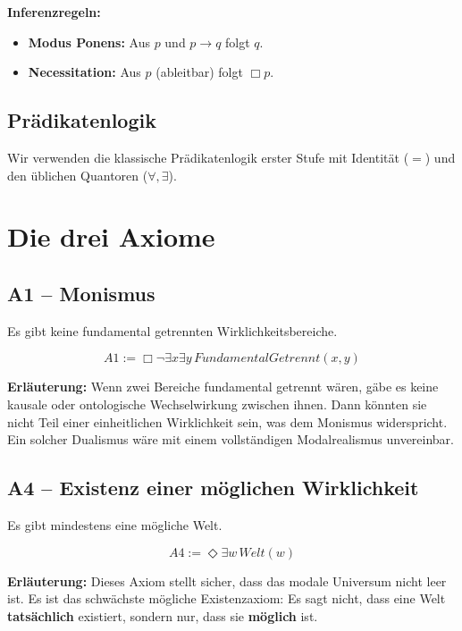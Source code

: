 \documentclass[
]{article}
\begin{document}
\textbf{Inferenzregeln:}
\begin{itemize}
\item \textbf{Modus Ponens:} Aus \(p\) und \(p \rightarrow q\) folgt \(q\).
\item \textbf{Necessitation:} Aus \(p\) (ableitbar) folgt \(\Box p\).
\end{itemize}

\subsection{Prädikatenlogik}\label{pruxe4dikatenlogik}

Wir verwenden die klassische Prädikatenlogik erster Stufe mit Identität (\(=\)) und den üblichen Quantoren (\(\forall, \exists\)).

\section{Die drei Axiome}\label{die-drei-axiome}

\subsection{A1 – Monismus}\label{a1-monismus}

Es gibt keine fundamental getrennten Wirklichkeitsbereiche.

\[
\boxed{A1 := \Box\neg\exists x\exists y\, FundamentalGetrennt(x,y)}
\]

\textbf{Erläuterung:} Wenn zwei Bereiche fundamental getrennt wären, gäbe es keine kausale oder ontologische Wechselwirkung zwischen ihnen. Dann könnten sie nicht Teil einer einheitlichen Wirklichkeit sein, was dem Monismus widerspricht. Ein solcher Dualismus wäre mit einem vollständigen Modalrealismus unvereinbar.

\subsection{A4 – Existenz einer möglichen Wirklichkeit}\label{a4-existenz-einer-moumlglichen-wirklichkeit}

Es gibt mindestens eine mögliche Welt.

\[
\boxed{A4 := \Diamond\exists w\, Welt(w)}
\]

\textbf{Erläuterung:} Dieses Axiom stellt sicher, dass das modale Universum nicht leer ist. Es ist das schwächste mögliche Existenzaxiom: Es sagt nicht, dass eine Welt \textbf{tatsächlich} existiert, sondern nur, dass sie \textbf{möglich} ist.
\end{document}
